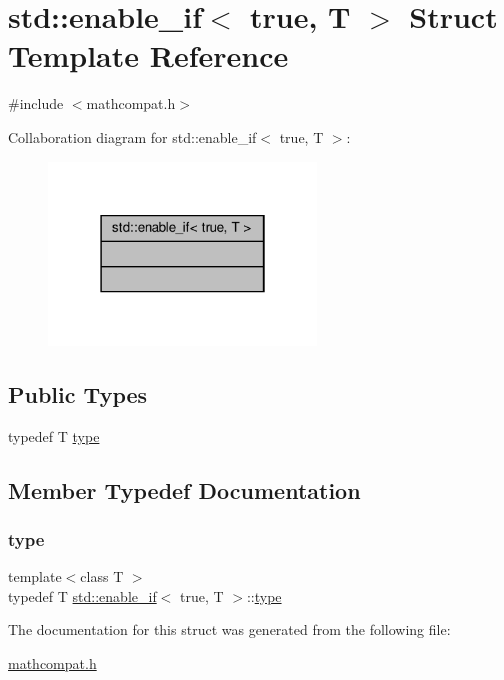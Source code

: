 \hypertarget{structstd_1_1enable__if_3_01true_00_01T_01_4}{}\section{std\+:\+:enable\+\_\+if$<$ true, T $>$ Struct Template Reference}
\label{structstd_1_1enable__if_3_01true_00_01T_01_4}


{\ttfamily \#include $<$mathcompat.\+h$>$}



Collaboration diagram for std\+:\+:enable\+\_\+if$<$ true, T $>$\+:\nopagebreak
\begin{figure}[H]
\begin{center}
\leavevmode
\includegraphics[width=202pt]{d7/dd6/structstd_1_1enable__if_3_01true_00_01T_01_4__coll__graph}
\end{center}
\end{figure}
\subsection*{Public Types}
\begin{DoxyCompactItemize}
\item 
typedef T \hyperlink{structstd_1_1enable__if_3_01true_00_01T_01_4_a393d6c819541dce0cd0d1afcec0ba55d}{type}
\end{DoxyCompactItemize}


\subsection{Member Typedef Documentation}
\mbox{\label{structstd_1_1enable__if_3_01true_00_01T_01_4_a393d6c819541dce0cd0d1afcec0ba55d}} 
\subsubsection{\texorpdfstring{type}{type}}
{\footnotesize\ttfamily template$<$class T $>$ \\
typedef T \hyperlink{structstd_1_1enable__if}{std\+::enable\+\_\+if}$<$ true, T $>$\+::\hyperlink{structstd_1_1enable__if_3_01true_00_01T_01_4_a393d6c819541dce0cd0d1afcec0ba55d}{type}}



The documentation for this struct was generated from the following file\+:\begin{DoxyCompactItemize}
\item 
\hyperlink{mathcompat_8h}{mathcompat.\+h}\end{DoxyCompactItemize}
